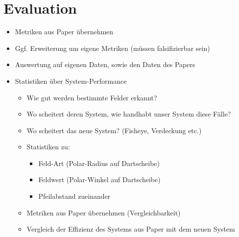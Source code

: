 \section{Evaluation}
\label{sec:evaluation}

\begin{itemize}
    \item Metriken aus Paper übernehmen
    \item Ggf. Erweiterung um eigene Metriken (müssen falsifizierbar sein)
    \item Auswertung auf eigenen Daten, sowie den Daten des Papers
    \item Statistiken über System-Performance
    \begin{itemize}
        \item Wie gut werden bestimmte Felder erkannt?
        \item Wo scheitert deren System, wie handhabt unser System diese Fälle?
        \item Wo scheitert das neue System? (Fisheye, Verdeckung etc.)
        \item Statistiken zu:
        \begin{itemize}
            \item Feld-Art (Polar-Radius auf Dartscheibe)
            \item Feldwert (Polar-Winkel auf Dartscheibe)
            \item Pfeilabstand zueinander
        \end{itemize}
        \item Metriken aus Paper übernehmen (Vergleichbarkeit)
        \item Vergleich der Effizienz des Systems aus Paper mit dem neuen System
    \end{itemize}
\end{itemize}
